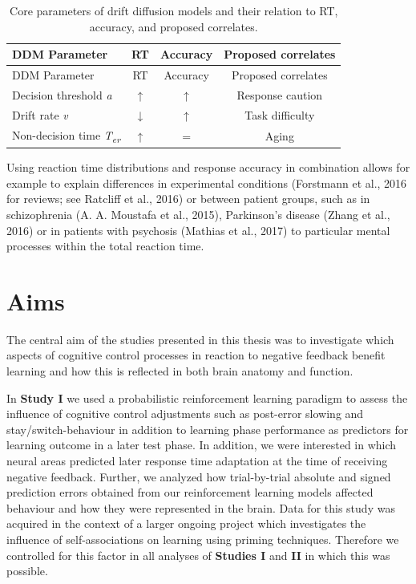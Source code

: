 \documentclass[12pt,openany]{book}
\theoremstyle{definition}
\theoremstyle{definition}
\theoremstyle{definition}
\theoremstyle{remark}
\begin{document}
\begin{longtable}[]{@{}lccc@{}}
\caption{Core parameters of drift diffusion models and their relation to
RT, accuracy, and proposed correlates.\label{tbl1}}\tabularnewline
\toprule
DDM Parameter & RT & Accuracy & Proposed correlates\tabularnewline
\midrule
\endfirsthead
\toprule
DDM Parameter & RT & Accuracy & Proposed correlates\tabularnewline
\midrule
\endhead
Decision threshold \emph{a} & ↑ & ↑ & Response caution\tabularnewline
Drift rate \emph{v} & ↓ & ↑ & Task difficulty\tabularnewline
Non-decision time \emph{T\textsubscript{er}} & ↑ & = &
Aging\tabularnewline
\bottomrule
\end{longtable}

Using reaction time distributions and response accuracy in combination
allows for example to explain differences in experimental conditions
(Forstmann et al., 2016 for reviews; see Ratcliff et al., 2016) or
between patient groups, such as in schizophrenia (A. A. Moustafa et al.,
2015), Parkinson's disease (Zhang et al., 2016) or in patients with
psychosis (Mathias et al., 2017) to particular mental processes within
the total reaction time.

\chapter{Aims}\label{aims}

The central aim of the studies presented in this thesis was to
investigate which aspects of cognitive control processes in reaction to
negative feedback benefit learning and how this is reflected in both
brain anatomy and function.

In \textbf{Study I} we used a probabilistic reinforcement learning
paradigm to assess the influence of cognitive control adjustments such
as post-error slowing and stay/switch-behaviour in addition to learning
phase performance as predictors for learning outcome in a later test
phase. In addition, we were interested in which neural areas predicted
later response time adaptation at the time of receiving negative
feedback. Further, we analyzed how trial-by-trial absolute and signed
prediction errors obtained from our reinforcement learning models
affected behaviour and how they were represented in the brain. Data for
this study was acquired in the context of a larger ongoing project which
investigates the influence of self-associations on learning using
priming techniques. Therefore we controlled for this factor in all
analyses of \textbf{Studies I} and \textbf{II} in which this was
possible.
\end{document}
